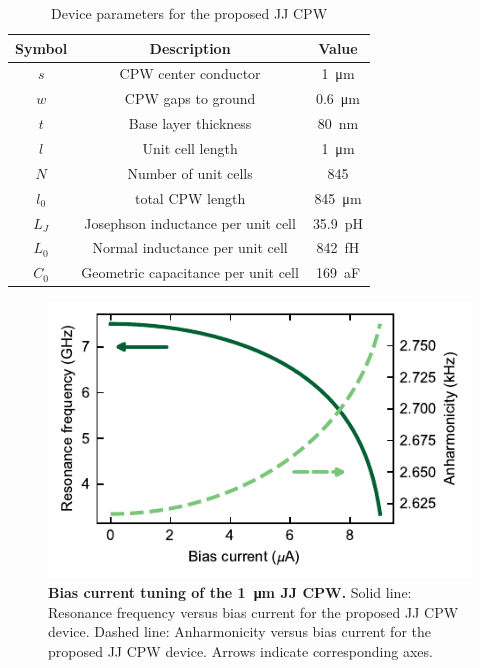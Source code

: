 \begin{table}
	\centering
	\caption{Device parameters for the proposed JJ CPW\label{tab:arraygeometry}}
	\begin{tabular}{ccc}
		\hline \hline
		Symbol       & Description                           & Value                            \\
		\hline
		$s$          & CPW center conductor                  & \SI{1}{\micro\meter}            \\
		$w$          & CPW gaps to ground                    & \SI{0.6}{\micro\meter}             \\
		$t$          & Base layer thickness                  & \SI{80}{\nano\meter}             \\
		$l$          & Unit cell length                  & \SI{1}{\micro\meter}             \\
		$N$          & Number of unit cells                 & 845             \\
		$l_0$        & total CPW length   & \SI{845}{\micro\meter}          \\
		$L_J$ & Josephson inductance per unit cell         & \SI{35.9}{\pico\henry} \\
		$L_0$ & Normal inductance per unit cell         & \SI{842}{\femto\henry} \\
		$C_0$ & Geometric capacitance per unit cell      & \SI{169}{\atto\farad}  \\
		\hline\hline
	\end{tabular}
\end{table}

\begin{figure}
	\centering
	\includegraphics[]{chapter-currentdetection/figures/SM_JJarrayCPW_vs_I}
	\caption{
		\textbf{Bias current tuning of the \SI{1}{\micro\meter} JJ CPW.}
		Solid line: Resonance frequency versus bias current for the proposed JJ CPW device.
		Dashed line: Anharmonicity versus bias current for the proposed JJ CPW device.
		Arrows indicate corresponding axes.
	}
	\label{fig:JJCPW-anh}
\end{figure}

